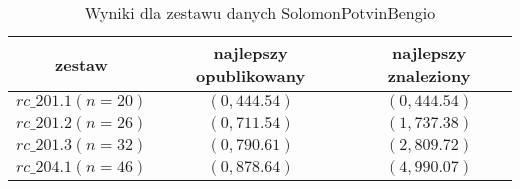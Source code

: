 \begin{frame}
\begin{table}
\centering
\caption{Wyniki dla zestawu danych SolomonPotvinBengio}
\begin{tabular}{c|c|c}
zestaw & najlepszy opublikowany & najlepszy znaleziony \\ \hline
$rc\_201.1 (n=20)$ & $(0, 444.54)$ & $(0, 444.54)$ \\
$rc\_201.2 (n=26)$ & $(0, 711.54)$ & $(1, 737.38)$ \\
$rc\_201.3 (n=32)$ & $(0, 790.61)$ & $(2, 809.72)$ \\
$rc\_204.1 (n=46)$ & $(0, 878.64)$ & $(4, 990.07)$ 
\end{tabular}
\end{table}
\end{frame}
